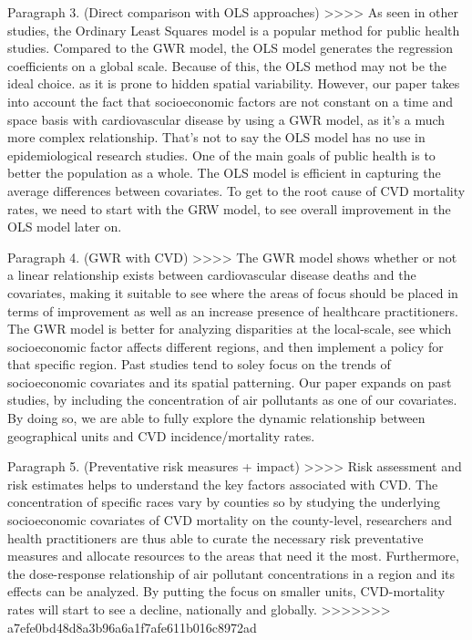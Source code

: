 \documentclass[
]{article}
\begin{document}
Paragraph 3. (Direct comparison with OLS approaches)
\textgreater\textgreater\textgreater\textgreater{} As seen in other
studies, the Ordinary Least Squares model is a popular method for public
health studies. Compared to the GWR model, the OLS model generates the
regression coefficients on a global scale. Because of this, the OLS
method may not be the ideal choice. as it is prone to hidden spatial
variability. However, our paper takes into account the fact that
socioeconomic factors are not constant on a time and space basis with
cardiovascular disease by using a GWR model, as it's a much more complex
relationship. That's not to say the OLS model has no use in
epidemiological research studies. One of the main goals of public health
is to better the population as a whole. The OLS model is efficient in
capturing the average differences between covariates. To get to the root
cause of CVD mortality rates, we need to start with the GRW model, to
see overall improvement in the OLS model later on.

Paragraph 4. (GWR with CVD)
\textgreater\textgreater\textgreater\textgreater{} The GWR model shows
whether or not a linear relationship exists between cardiovascular
disease deaths and the covariates, making it suitable to see where the
areas of focus should be placed in terms of improvement as well as an
increase presence of healthcare practitioners. The GWR model is better
for analyzing disparities at the local-scale, see which socioeconomic
factor affects different regions, and then implement a policy for that
specific region. Past studies tend to soley focus on the trends of
socioeconomic covariates and its spatial patterning. Our paper expands
on past studies, by including the concentration of air pollutants as one
of our covariates. By doing so, we are able to fully explore the dynamic
relationship between geographical units and CVD incidence/mortality
rates.

Paragraph 5. (Preventative risk measures + impact)
\textgreater\textgreater\textgreater\textgreater{} Risk assessment and
risk estimates helps to understand the key factors associated with CVD.
The concentration of specific races vary by counties so by studying the
underlying socioeconomic covariates of CVD mortality on the
county-level, researchers and health practitioners are thus able to
curate the necessary risk preventative measures and allocate resources
to the areas that need it the most. Furthermore, the dose-response
relationship of air pollutant concentrations in a region and its effects
can be analyzed. By putting the focus on smaller units, CVD-mortality
rates will start to see a decline, nationally and globally.
\textgreater\textgreater\textgreater\textgreater\textgreater\textgreater\textgreater{}
a7efe0bd48d8a3b96a6a1f7afe611b016c8972ad
\end{document}
